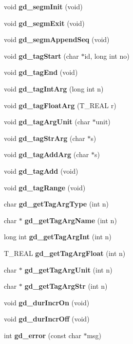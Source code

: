 \begin{CompactItemize}
void {\bf gd\_\-segm\-Init} (void)
\item 
void {\bf gd\_\-segm\-Exit} (void)
\item 
void {\bf gd\_\-segm\-Append\-Seq} (void)
\item 
void {\bf gd\_\-tag\-Start} (char $\ast$id, long int no)
\item 
void {\bf gd\_\-tag\-End} (void)
\item 
void {\bf gd\_\-tag\-Int\-Arg} (long int n)
\item 
void {\bf gd\_\-tag\-Float\-Arg} (T\_\-REAL r)
\item 
void {\bf gd\_\-tag\-Arg\-Unit} (char $\ast$unit)
\item 
void {\bf gd\_\-tag\-Str\-Arg} (char $\ast$s)
\item 
void {\bf gd\_\-tag\-Add\-Arg} (char $\ast$s)
\item 
void {\bf gd\_\-tag\-Add} (void)
\item 
void {\bf gd\_\-tag\-Range} (void)
\item 
char {\bf gd\_\-get\-Tag\-Arg\-Type} (int n)
\item 
char $\ast$ {\bf gd\_\-get\-Tag\-Arg\-Name} (int n)
\item 
long int {\bf gd\_\-get\-Tag\-Arg\-Int} (int n)
\item 
T\_\-REAL {\bf gd\_\-get\-Tag\-Arg\-Float} (int n)
\item 
char $\ast$ {\bf gd\_\-get\-Tag\-Arg\-Unit} (int n)
\item 
char $\ast$ {\bf gd\_\-get\-Tag\-Arg\-Str} (int n)
\item 
void {\bf gd\_\-dur\-Incr\-On} (void)
\item 
void {\bf gd\_\-dur\-Incr\-Off} (void)
\item 
int {\bf gd\_\-error} (const char $\ast$msg)
\end{CompactItemize}
